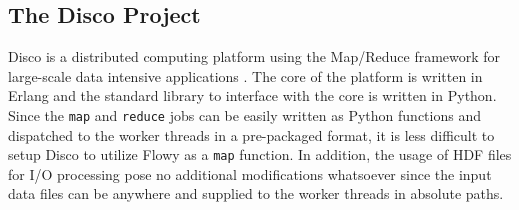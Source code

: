 \subsection{The Disco Project}\label{subsec:disco}
Disco is a distributed computing platform using the Map/Reduce framework for large-scale data intensive applications \cite{pmundkur:2011}. The core of the platform is written in Erlang and the standard library to interface with the core is written in Python. Since the \texttt{map} and \texttt{reduce} jobs can be easily written as Python functions and dispatched to the worker threads in a pre-packaged format, it is less difficult to setup Disco to utilize Flowy as a \texttt{map} function. In addition, the usage of \ac{HDF} files for I/O processing pose no additional modifications whatsoever since the input data files can be anywhere and supplied to the worker threads in absolute paths.

